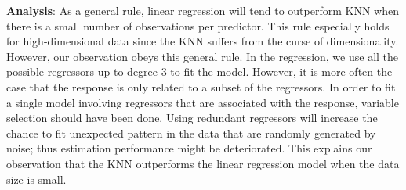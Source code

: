 \documentclass[]{article}
\begin{document}
\textbf{Analysis}:  As a general rule, linear regression will tend to outperform KNN when there is a small number of observations per predictor. This rule especially holds for high-dimensional data since the KNN suffers from the curse of dimensionality. However, our observation obeys this general rule. In the regression, we use all the possible regressors up to degree 3 to fit the model. However, it is more often the case that the response is only related to a subset of the regressors. In order to fit a single model involving regressors that are associated with the response, variable selection should have been done. Using redundant regressors will increase the chance to fit unexpected pattern in the data that are randomly generated by noise; thus estimation performance might be deteriorated. This explains our observation that the KNN outperforms the linear regression model when the data size is small. 
\end{document}

